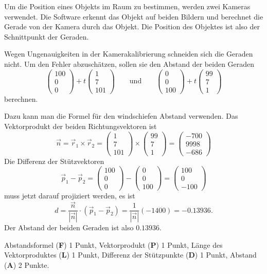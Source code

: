 Um die Position eines Objekts im Raum zu bestimmen, werden zwei Kameras
verwendet.
Die Software erkennt das Objekt auf beiden Bildern und berechnet
die Gerade von der Kamera durch das Objekt.
Die Position des Objektes ist also der Schnittpunkt der Geraden.

Wegen Ungenauigkeiten in der Kamerakalibrierung schneiden sich die Geraden
nicht. 
Um den Fehler abzuschätzen, sollen sie den Abstand der beiden Geraden
\[
\begin{pmatrix} 100\\0\\0 \end{pmatrix}
+
t\begin{pmatrix} 1\\7\\ 101\end{pmatrix}
\qquad\text{und}\qquad
\begin{pmatrix} 0\\0\\ 100 \end{pmatrix}
+
t\begin{pmatrix} 99\\7\\1 \end{pmatrix}
\]
berechnen.


\begin{loesung}
Dazu kann man die Formel für den windschiefen Abstand verwenden.
Das Vektorprodukt der beiden Richtungsvektoren ist
\[
\vec n
=
\vec r_1
\times
\vec r_2
=
\begin{pmatrix} 1\\7\\ 101\end{pmatrix}
\times
\begin{pmatrix} 99\\7\\1 \end{pmatrix}
=
\begin{pmatrix} -700\\9998\\-686 \end{pmatrix}
\]
Die Differenz der Stützvektoren
\[
\vec p_1-\vec p_2
=
\begin{pmatrix} 100\\0\\0 \end{pmatrix}
-
\begin{pmatrix} 0\\0\\ 100 \end{pmatrix}
=
\begin{pmatrix} 100\\0\\-100 \end{pmatrix}
\]
muss jetzt darauf projiziert werden, es ist
\[
d
=
\frac{\vec n}{|\vec n|}\cdot (\vec p_1-\vec p_2)
=
\frac{1}{|\vec n|}(-1400)=-0.13936.
\]
Der Abstand der beiden Geraden ist also $0.13936$.
\end{loesung}

\begin{bewertung}
Abstandsformel ({\bf F}) 1 Punkt,
Vektorprodukt ({\bf P}) 1 Punkt,
Länge des Vektorproduktes ({\bf L}) 1 Punkt,
Differenz der Stützpunkte ({\bf D}) 1 Punkt,
Abstand ({\bf A}) 2 Punkte.
\end{bewertung}

